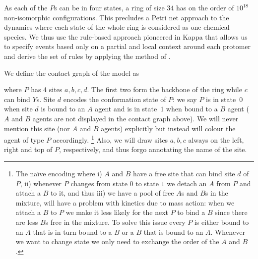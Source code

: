 As each of the $P$s can be in four states,
a ring of size $34$ has on the order of
$10^{18}$ non-isomorphic configurations.
This precludes a Petri net approach to the dynamics
where each state of the whole ring
is considered as one chemical species.
We thus use the rule-based approach pioneered in Kappa %
that allows us to specify events based only on
a partial and local context around each protomer
and derive the set of rules
by applying the method of .

We define the contact graph of the model as
\begin{center}
\end{center}
where $P$ has 4 sites $a,b,c,d$.
The first two form the backbone of the ring
while $c$ can bind $Y$s. %
Site $d$ encodes the conformation state of $P$:
we say $P$ is in state~$0$ when site $d$ is bound to an $A$ agent
and is in state~$1$ when bound to a $B$ agent
($A$ and $B$ agents are not displayed in the contact graph above).
We will never mention this site (nor $A$ and $B$ agents) explicitly
but instead will colour the agent of type $P$ accordingly.%
\footnote{
  The na\"ive encoding where
  i) $A$ and $B$ have a free site that can bind site $d$ of $P$,
  ii) whenever $P$ changes from state $0$ to state $1$
  we detach an $A$ from $P$ and attach a $B$ to it,
  and thus iii) we have a pool of free $A$s and $B$s in the mixture,
  will have a problem with kinetics due to mass action:
  when we attach a $B$ to $P$ we make it less likely
  for the next $P$ to bind a $B$
  since there are less $B$s free in the mixture.
  To solve this issue every $P$ is either bound
  to an $A$ that is in turn bound to a $B$
  or a $B$ that is bound to an $A$.
  Whenever we want to change state
  we only need to exchange the order of the $A$ and $B$.}
Also, we will draw sites $a,b,c$
always on the left, right and top of $P$, respectively,
and thus forgo annotating the name of the site.

